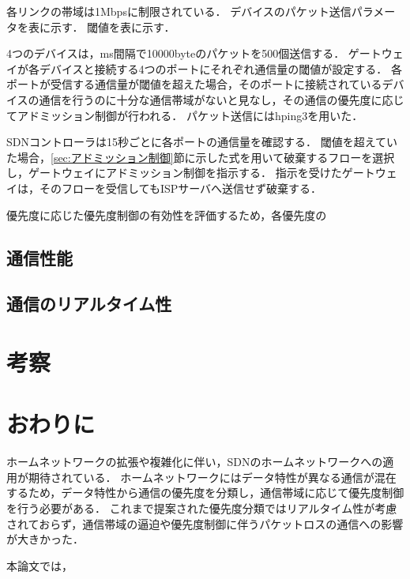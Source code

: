 \documentclass[a4paper,11pt,uplatex]{ujreport}
\begin{document}
各リンクの帯域は1Mbpsに制限されている．
デバイスのパケット送信パラメータを表に示す．
閾値を表に示す．

4つのデバイスは，ms間隔で10000byteのパケットを500個送信する．
ゲートウェイが各デバイスと接続する4つのポートにそれぞれ通信量の閾値が設定する．
各ポートが受信する通信量が閾値を超えた場合，そのポートに接続されているデバイスの通信を行うのに十分な通信帯域がないと見なし，その通信の優先度に応じてアドミッション制御が行われる．
パケット送信にはhping3を用いた．

SDNコントローラは15秒ごとに各ポートの通信量を確認する．
閾値を超えていた場合，\ref{sec:アドミッション制御}節に示した式を用いて破棄するフローを選択し，ゲートウェイにアドミッション制御を指示する．
指示を受けたゲートウェイは，そのフローを受信してもISPサーバへ送信せず破棄する．

優先度に応じた優先度制御の有効性を評価するため，各優先度の

\section{通信性能}
\label{通信性能}

\section{通信のリアルタイム性}
\label{通信のリアルタイム性}


\chapter{考察}
\label{chap:考察}

  

\chapter{おわりに}
\label{chap:おわりに}


  ホームネットワークの拡張や複雑化に伴い，SDNのホームネットワークへの適用が期待されている．
  ホームネットワークにはデータ特性が異なる通信が混在するため，データ特性から通信の優先度を分類し，通信帯域に応じて優先度制御を行う必要がある．
  これまで提案された優先度分類ではリアルタイム性が考慮されておらず，通信帯域の逼迫や優先度制御に伴うパケットロスの通信への影響が大きかった．\par
  本論文では，
\end{document}
